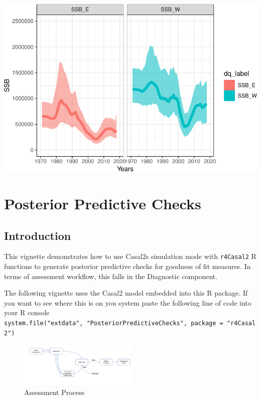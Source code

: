\documentclass[
]{book}
\begin{document}
\includegraphics{_main_files/figure-latex/dqs-1.pdf}

\hypertarget{PPC}{%
\chapter{Posterior Predictive Checks}\label{PPC}}

\hypertarget{introduction}{%
\section{Introduction}\label{introduction}}

This vignette demonstrates how to use Casal2s simulation mode with \texttt{r4Casal2} R functions to generate posterior predictive checks for goodness of fit measures. In terms of assessment workflow, this falls in the Diagnostic component.

The following vignette uses the Casal2 model embedded into this R package. If you want to see where this is on you system paste the following line of code into your R console \texttt{system.file("extdata",\ "PosteriorPredictiveChecks",\ package\ =\ "r4Casal2")}

\begin{figure}
\centering
\includegraphics[width=0.5\textwidth,height=\textheight]{Figures/assessment_process.png}
\caption{Assessment Process}
\end{figure}
\end{document}
